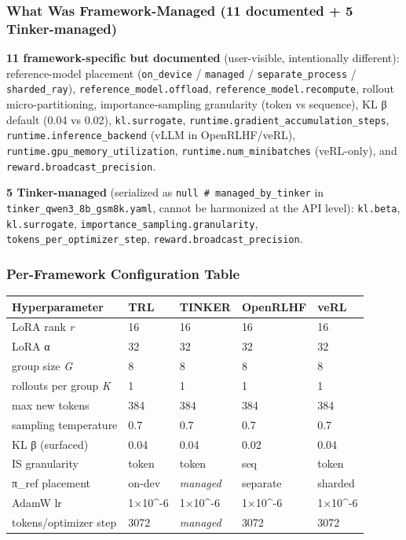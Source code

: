 \documentclass[
  american,
  11pt,
  a4paper,
  oneside]{report}
\newcounter{none} %
\begin{document}
\subsubsection{What Was Framework-Managed (11 documented + 5
Tinker-managed)}\label{what-was-framework-managed-11-documented-5-tinker-managed}

\textbf{11 framework-specific but documented} (user-visible,
intentionally different): reference-model placement (\texttt{on\_device}
/ \texttt{managed} / \texttt{separate\_process} /
\texttt{sharded\_ray}), \texttt{reference\_model.offload},
\texttt{reference\_model.recompute}, rollout micro-partitioning,
importance-sampling granularity (token vs sequence), KL β default (0.04
vs 0.02), \texttt{kl.surrogate},
\texttt{runtime.gradient\_accumulation\_steps},
\texttt{runtime.inference\_backend} (vLLM in OpenRLHF/veRL),
\texttt{runtime.gpu\_memory\_utilization},
\texttt{runtime.num\_minibatches} (veRL-only), and
\texttt{reward.broadcast\_precision}.

\textbf{5 Tinker-managed} (serialized as
\texttt{null\ \#\ managed\_by\_tinker} in
\texttt{tinker\_qwen3\_8b\_gsm8k.yaml}, cannot be harmonized at the API
level): \texttt{kl.beta}, \texttt{kl.surrogate},
\texttt{importance\_sampling.granularity},
\texttt{tokens\_per\_optimizer\_step},
\texttt{reward.broadcast\_precision}.

\subsubsection{Per-Framework Configuration
Table}\label{per-framework-configuration-table}

{\def\LTcaptype{none} %
\begin{longtable}[]{@{}lllll@{}}
\toprule\noalign{}
Hyperparameter & TRL & TINKER & OpenRLHF & veRL \\
\midrule\noalign{}
\endhead
\bottomrule\noalign{}
\endlastfoot
LoRA rank \emph{r} & 16 & 16 & 16 & 16 \\
LoRA α & 32 & 32 & 32 & 32 \\
group size \emph{G} & 8 & 8 & 8 & 8 \\
rollouts per group \emph{K} & 1 & 1 & 1 & 1 \\
max new tokens & 384 & 384 & 384 & 384 \\
sampling temperature & 0.7 & 0.7 & 0.7 & 0.7 \\
KL β (surfaced) & 0.04 & 0.04 & 0.02 & 0.04 \\
IS granularity & token & token & seq & token \\
π\_ref placement & on-dev & \emph{managed} & separate & sharded \\
AdamW lr & 1×10\^{}-6 & 1×10\^{}-6 & 1×10\^{}-6 & 1×10\^{}-6 \\
tokens/optimizer step & 3072 & \emph{managed} & 3072 & 3072 \\
\end{longtable}
}
\end{document}
